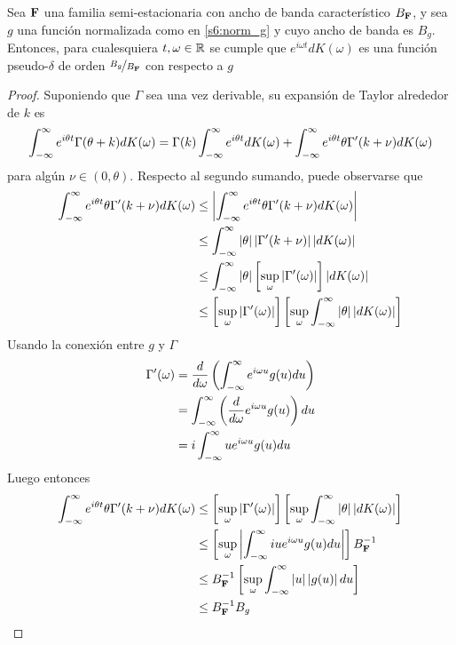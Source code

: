 \begin{teorema}
Sea $\mathbf{F}$ una familia semi-estacionaria con ancho de banda característico $B_{\mathbf{F}}$, y sea $g$ una función normalizada como en \ref{s6:norm_g} y cuyo ancho de banda es $B_g$. Entonces, para cualesquiera $t, \omega \in \mathbb{R}$ se cumple que $e^{i \omega t} dK(\omega)$ es una función pseudo-$\delta$ de orden $\nicefrac{B_g}{B_{\mathbf{F}}}$ con respecto a $g$
\label{teo:s6:lema}
\end{teorema}
\begin{proof}
Suponiendo que $\Gamma$ sea una vez derivable, su expansión de Taylor alrededor de $k$ es
\begin{equation*}
\int_{-\infty}^{\infty} e^{i\theta t} \Gamma(\theta + k) dK(\omega)
= \Gamma(k) \int_{-\infty}^{\infty} e^{i \theta t} dK(\omega) + 
\int_{-\infty}^{\infty} e^{i \theta t} \theta \Gamma^{\prime}(k + \nu) dK(\omega)
\end{equation*}
para algún $\nu \in (0,\theta)$. Respecto al segundo sumando, puede observarse que
\begin{align*}
\int_{-\infty}^{\infty} e^{i \theta t} \theta \Gamma^{\prime}(k + \nu) dK(\omega)
&\leq
\left|  \int_{-\infty}^{\infty} e^{i \theta t} \theta \Gamma^{\prime}(k + \nu) dK(\omega) \right| \\
&\leq
\int_{-\infty}^{\infty} \left|  \theta \right| \left|  \Gamma^{\prime}(k + \nu) \right| \left|  dK(\omega) \right| \\
&\leq
\int_{-\infty}^{\infty} \left|  \theta \right| \left[ \sup_\omega \left|  \Gamma^{\prime}(\omega) \right| \right] \left|  dK(\omega) \right| \\
&\leq
\left[ \sup_\omega \left|  \Gamma^{\prime}(\omega) \right| \right]
\left[ \sup_\omega
\int_{-\infty}^{\infty} \left|  \theta \right| \left|  dK(\omega) \right| \right]
\end{align*}
Usando la conexión entre $g$ y $\Gamma$
\begin{align*}
\Gamma^{\prime}(\omega) 
&= \frac{d}{d\omega} \left( \int_{-\infty}^{\infty} e^{i \omega u} g(u) du \right) \\
&= \int_{-\infty}^{\infty} \left( \frac{d}{d\omega} e^{i \omega u} g(u) \right) du \\
&= i \int_{-\infty}^{\infty} u e^{i \omega u} g(u) du \\
\end{align*}
Luego entonces
\begin{align*}
\int_{-\infty}^{\infty} e^{i \theta t} \theta \Gamma^{\prime}(k + \nu) dK(\omega)
&\leq
\left[ \sup_\omega \left|  \Gamma^{\prime}(\omega) \right| \right] 
\left[ \sup_\omega
\int_{-\infty}^{\infty} \left|  \theta \right| \left|  dK(\omega) \right| \right] \\
&\leq 
\left[ \sup_\omega \left|  \int_{-\infty}^{\infty} i u e^{i \omega u} g(u) du  \right| \right] 
B_{\mathbf{F}}^{-1} \\
&\leq 
B_{\mathbf{F}}^{-1}
\left[ \sup_\omega \int_{-\infty}^{\infty} \left|  u  \right| \left|  g(u) \right| du \right] \\
&\leq
B_{\mathbf{F}}^{-1} B_g
\end{align*}
\end{proof}

